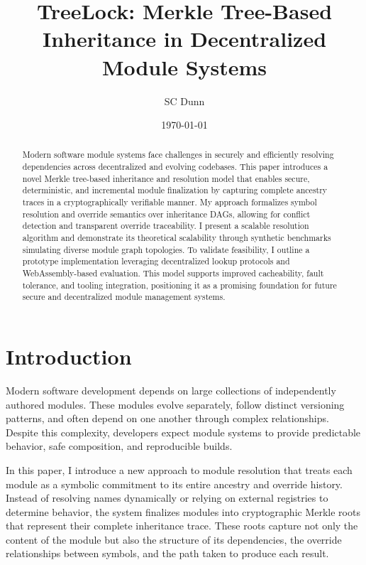 \documentclass[sigplan,screen]{acmart}
\title{TreeLock: Merkle Tree-Based Inheritance in Decentralized Module Systems}
\author{SC Dunn}
\affiliation{%
\institution{Starlabs, LLC}
\city{Colorado Springs}
\state{CO}
\country{USA}}
\date{\today}
\begin{document}
\begin{abstract}
Modern software module systems face challenges in securely and efficiently resolving dependencies across decentralized and evolving codebases. This paper introduces a novel Merkle tree-based inheritance and resolution model that enables secure, deterministic, and incremental module finalization by capturing complete ancestry traces in a cryptographically verifiable manner. My approach formalizes symbol resolution and override semantics over inheritance DAGs, allowing for conflict detection and transparent override traceability. I present a scalable resolution algorithm and demonstrate its theoretical scalability through synthetic benchmarks simulating diverse module graph topologies. To validate feasibility, I outline a prototype implementation leveraging decentralized lookup protocols and WebAssembly-based evaluation. This model supports improved cacheability, fault tolerance, and tooling integration, positioning it as a promising foundation for future secure and decentralized module management systems.
\vfill
\end{abstract}

\maketitle

\section{Introduction}

Modern software development depends on large collections of independently authored modules. These modules evolve separately, follow distinct versioning patterns, and often depend on one another through complex relationships. Despite this complexity, developers expect module systems to provide predictable behavior, safe composition, and reproducible builds.

In this paper, I introduce a new approach to module resolution that treats each module as a symbolic commitment to its entire ancestry and override history. Instead of resolving names dynamically or relying on external registries to determine behavior, the system finalizes modules into cryptographic Merkle roots that represent their complete inheritance trace. These roots capture not only the content of the module but also the structure of its dependencies, the override relationships between symbols, and the path taken to produce each result.
\end{document}
